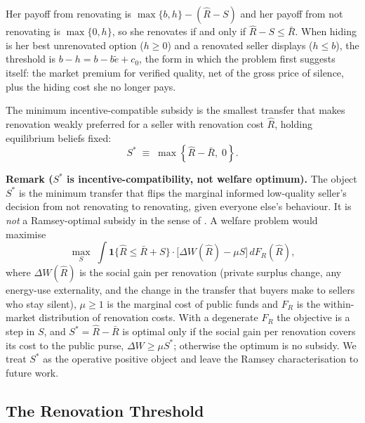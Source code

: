 \documentclass[10pt,letterpaper]{bp-template-concise}
\begin{document}
\noindent Her payoff from renovating is $\max\{b,h\}-(\hat R-S)$ and her payoff from not renovating is $\max\{0,h\}$, so she renovates if and only if $\hat R-S\le\bar R$. When hiding is her best unrenovated option ($h\ge0$) and a renovated seller displays ($h\le b$), the threshold is $b-h=b-b\tilde e+c_0$, the form in which the problem first suggests itself: the market premium for verified quality, net of the gross price of silence, plus the hiding cost she no longer pays.

\begin{definition}
\label{def:minimum_subsidy}
The minimum incentive-compatible subsidy is the smallest transfer that makes renovation weakly preferred for a seller with renovation cost $\hat R$, holding equilibrium beliefs fixed:
\begin{equation}
    S^*\;\equiv\;\max\!\left\{\hat{R}-\bar{R},\;0\right\}.
    \label{eq:subsidy}
\end{equation}
\end{definition}

\medskip\noindent\textbf{Remark ($S^*$ is incentive-compatibility, not welfare optimum).}
The object $S^*$ is the minimum transfer that flips the marginal informed low-quality seller's decision from not renovating to renovating, given everyone else's behaviour. It is \emph{not} a Ramsey-optimal subsidy in the sense of \citet{ramsey_taxation_1927}. A welfare problem would maximise
\[
    \max_S \; \int \mathbf{1}\{\hat R \le \bar R + S\} \cdot \big[\Delta W(\hat R) - \mu S\big]\, dF_R(\hat R),
\]
where $\Delta W(\hat R)$ is the social gain per renovation (private surplus change, any energy-use externality, and the change in the transfer that buyers make to sellers who stay silent), $\mu\ge 1$ is the marginal cost of public funds and $F_R$ is the within-market distribution of renovation costs. With a degenerate $F_R$ the objective is a step in $S$, and $S^*=\hat R-\bar R$ is optimal only if the social gain per renovation covers its cost to the public purse, $\Delta W\ge\mu S^*$; otherwise the optimum is no subsidy. We treat $S^*$ as the operative positive object and leave the Ramsey characterisation to future work.

\subsection{The Renovation Threshold}
\label{ss:threshold}
\end{document}
